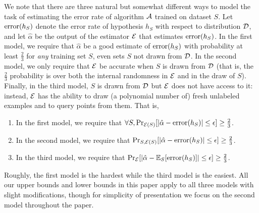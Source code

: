 
We note that there are three natural but somewhat different ways to model the task of estimating the error rate of algorithm ${\mathcal{A}}$ trained on dataset $S$. Let ${\mathrm{error}}(h_S)$ denote the error rate of hypothesis $h_S$ with respect to distribution ${\mathcal{D}}$, and let $\hat\alpha$ be the output of the estimator ${\mathcal E}$ that estimates ${\mathrm{error}}(h_S)$. In the first model, we require that $\hat\alpha$ be a good estimate of ${\mathrm{error}}(h_S)$ with probability at least $\frac23$ for {\em any} training set $S$, even sets $S$ not drawn from ${\mathcal{D}}$.  In the second model, we only require that ${\mathcal E}$ be accurate when $S$ is drawn from ${\mathcal{D}}$ (that is, the $\frac23$ probability is over both the internal randomness in ${\mathcal E}$ and in the draw of $S$).  Finally, in the third model, $S$ is drawn from ${\mathcal{D}}$ but ${\mathcal E}$ does not have access to it: instead, ${\mathcal E}$ has the ability to draw (a polynomial number of) fresh unlabeled examples and to query points from them.  That is,
\begin{enumerate}
\item In the first model, we require that $\forall S,\Pr_{{\mathcal E}(S)}[|\hat\alpha-{\mathrm{error}}(h_S)|\leq\epsilon]\geq \frac{2}{3}$. 
\item In the second model, we require that $\Pr_{S,{\mathcal E}(S)}[|\hat\alpha-{\mathrm{error}}(h_S)|\leq \epsilon]\geq \frac{2}{3}$. 
\item In the third model, we require that $\Pr_{{\mathcal E}}[|\hat\alpha-\mathbb E_S[{\mathrm{error}}(h_S)]|\leq\epsilon]\geq \frac{2}{3}$. 
\end{enumerate}
Roughly, the first model is the hardest while the third model is the easiest.  
All our upper bounds and lower bounds in this paper apply to all three models with slight modifications, though for simplicity of presentation we focus on the second model throughout the paper.%




